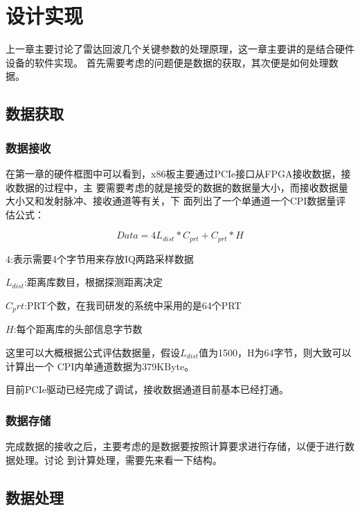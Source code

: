 \documentclass[a4paper,12pt]{report}
\begin{document}
\chapter{设计实现}
\begin{spacing}{1.5}
\songti{}

上一章主要讨论了雷达回波几个关键参数的处理原理，这一章主要讲的是结合硬件设备的软件实现。
首先需要考虑的问题便是数据的获取，其次便是如何处理数据。
\section{数据获取}
\subsection{数据接收}
在第一章的硬件框图中可以看到，x86板主要通过PCIe接口从FPGA接收数据，接收数据的过程中，主
要需要考虑的就是接受的数据的数据量大小，而接收数据量大小又和发射脉冲、接收通道等有关，下
面列出了一个单通道一个CPI数据量评估公式：

    \begin{proposition}[数据量算公式]

    \begin{equation}
        Data=4L_{dist}*C_{prt}+C_{prt}*H
    \end{equation}

    $4$:表示需要4个字节用来存放IQ两路采样数据

    $L_{dist}$:距离库数目，根据探测距离决定

    $C_prt$:PRT个数，在我司研发的系统中采用的是64个PRT

    $H$:每个距离库的头部信息字节数

    \end{proposition}

这里可以大概根据公式评估数据量，假设$L_{dist}$值为1500，H为64字节，则大致可以计算出一个
CPI内单通道数据为379KByte。

目前PCIe驱动已经完成了调试，接收数据通道目前基本已经打通。

\subsection{数据存储}
    完成数据的接收之后，主要考虑的是数据要按照计算要求进行存储，以便于进行数据处理。讨论
到计算处理，需要先来看一下结构。

\section{数据处理}


\end{spacing}
\end{document}

